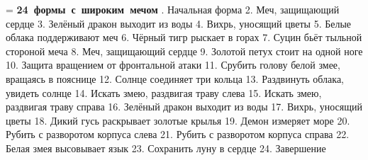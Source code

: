\magnification=
\nopagenumbers
\parindent=10pt
\topglue -15pt
\hbox{\kern60pt\bf 24 формы с широким мечом}
\vskip35pt
. Начальная форма
2. Меч, защищающий сердце
3. Зелёный дракон выходит из воды
4. Вихрь, уносящий цветы
5. Белые облака поддерживают меч
6. Чёрный тигр рыскает в горах
7. Суцин бьёт тыльной стороной меча
8. Меч, защищающий сердце
9. Золотой петух стоит на одной ноге
10. Защита вращением от фронтальной атаки
11. Срубить голову белой змее, вращаясь в пояснице
12. Солнце соединяет три кольца
13. Раздвинуть облака, увидеть солнце
14. Искать змею, раздвигая траву слева
15. Искать змею, раздвигая траву справа
16. Зелёный дракон выходит из воды
17. Вихрь, уносящий цветы
18. Дикий гусь раскрывает золотые крылья
19. Демон измеряет море
20. Рубить с разворотом корпуса слева
21. Рубить с разворотом корпуса справа
22. Белая змея высовывает язык
23. Сохранить луну в сердце
24. Завершение
\bye

